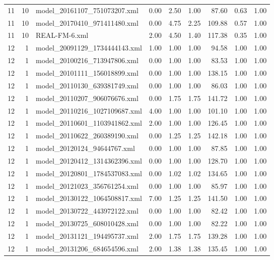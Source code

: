 \begin{table}[ht]
\begin{tabular}{rrlrrrrrr}
   11 &  10 & model\_20161107\_751073207.xml & 0.00 & 2.50 & 1.00 & 87.60 & 0.63 & 1.00 \\ 
   11 &  10 & model\_20170410\_971411480.xml & 0.00 & 4.75 & 2.25 & 109.88 & 0.57 & 1.00 \\ 
   11 &  10 & REAL-FM-6.xml & 2.00 & 4.50 & 1.40 & 117.38 & 0.35 & 1.00 \\ 
   12 &   1 & model\_20091129\_1734444143.xml & 1.00 & 1.00 & 1.00 & 94.58 & 1.00 & 1.00 \\ 
   12 &   1 & model\_20100216\_713947806.xml & 0.00 & 1.00 & 1.00 & 83.53 & 1.00 & 1.00 \\ 
   12 &   1 & model\_20101111\_156018899.xml & 0.00 & 1.00 & 1.00 & 138.15 & 1.00 & 1.00 \\ 
   12 &   1 & model\_20110130\_639381749.xml & 0.00 & 1.00 & 1.00 & 86.03 & 1.00 & 1.00 \\ 
   12 &   1 & model\_20110207\_906076676.xml & 0.00 & 1.75 & 1.75 & 141.72 & 1.00 & 1.00 \\ 
   12 &   1 & model\_20110216\_1027109687.xml & 4.00 & 1.00 & 1.00 & 101.10 & 1.00 & 1.00 \\ 
   12 &   1 & model\_20110601\_1103941862.xml & 2.00 & 1.00 & 1.00 & 126.45 & 1.00 & 1.00 \\ 
   12 &   1 & model\_20110622\_260389190.xml & 0.00 & 1.25 & 1.25 & 142.18 & 1.00 & 1.00 \\ 
   12 &   1 & model\_20120124\_94644767.xml & 0.00 & 1.00 & 1.00 & 87.85 & 1.00 & 1.00 \\ 
   12 &   1 & model\_20120412\_1314362396.xml & 0.00 & 1.00 & 1.00 & 128.70 & 1.00 & 1.00 \\ 
   12 &   1 & model\_20120801\_1784537083.xml & 0.00 & 1.02 & 1.02 & 134.65 & 1.00 & 1.00 \\ 
   12 &   1 & model\_20121023\_356761254.xml & 0.00 & 1.00 & 1.00 & 85.97 & 1.00 & 1.00 \\ 
   12 &   1 & model\_20130122\_1064508817.xml & 7.00 & 1.25 & 1.25 & 141.50 & 1.00 & 1.00 \\ 
   12 &   1 & model\_20130722\_443972122.xml & 0.00 & 1.00 & 1.00 & 82.42 & 1.00 & 1.00 \\ 
   12 &   1 & model\_20130725\_608010428.xml & 0.00 & 1.00 & 1.00 & 82.22 & 1.00 & 1.00 \\ 
   12 &   1 & model\_20131121\_194495737.xml & 2.00 & 1.75 & 1.75 & 139.28 & 1.00 & 1.00 \\ 
   12 &   1 & model\_20131206\_684654596.xml & 2.00 & 1.38 & 1.38 & 135.45 & 1.00 & 1.00 \\ 

\end{tabular}
\end{table}
